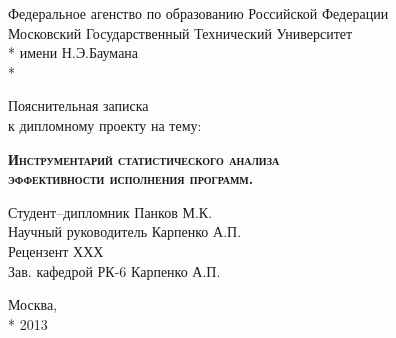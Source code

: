 \begin{titlepage}
    \newpage
    
    \begin{center}
        Федеральное агенство по образованию Российской Федерации \\
        Московский Государственный Технический Университет \\*
        имени Н.Э.Баумана \\*
        \vspace{-12mm}
        \begin{figure}[h]
        \end{figure}
        \vspace{-16mm}
        \hrulefill
    \end{center}
    \begin{center}
        \Large Пояснительная записка \\ к дипломному проекту на тему:
    \end{center}
    
    \vspace{2.5em}
    
    \begin{center}
        \textsc{\textbf{Инструментарий статистического анализа\\
                эффективности исполнения программ.}}
    \end{center}
    
    \vspace{6em}
    
    \begin{flushleft}
        \hspace{6.5cm}Студент--дипломник \hrulefill Панков М.К. \\
        \vspace{1.5em}
        \hspace{6.5cm}Научный руководитель \hrulefill Карпенко А.П.\\
        \vspace{1.5em}
        \hspace{6.5cm}Рецензент \hrulefill ХХХ\\
        \vspace{1.5em}
        \hspace{6.5cm}Зав. кафедрой РК-6 \hrulefill Карпенко А.П.
    \end{flushleft}
    
    \vspace{\fill}
    
    \begin{center}
        Москва, \\*
        2013
    \end{center}

\end{titlepage}
